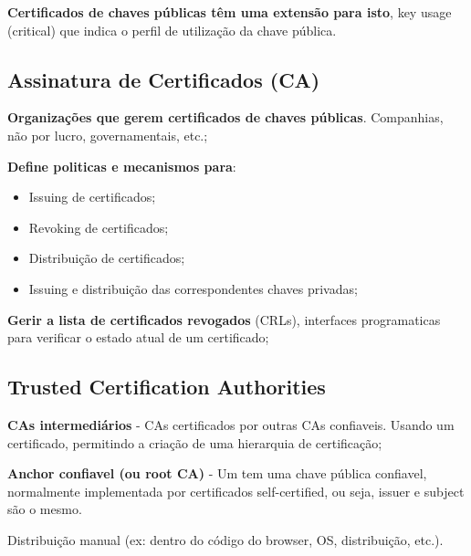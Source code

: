 \documentclass{article}
\begin{document}
\textbf{Certificados de chaves públicas têm uma extensão para isto},
key usage (critical) que indica o perfil de utilização da chave pública.

\subsection{Assinatura de Certificados (CA)}

\begin{flushleft}
  \textbf{Organizações que gerem certificados de chaves públicas}.
  Companhias, não por lucro, governamentais, etc.;

  \vspace{2mm}

  \textbf{Define politicas e mecanismos para}:
  \begin{itemize}
    \item Issuing de certificados;
    \item Revoking de certificados;
    \item Distribuição de certificados;
    \item Issuing e distribuição das correspondentes chaves privadas;
  \end{itemize}

  \vspace{2mm}

  \textbf{Gerir a lista de certificados revogados} (CRLs), interfaces
  programaticas para verificar o estado atual de um certificado;
\end{flushleft}

\pagebreak

\subsection{Trusted Certification Authorities}

\begin{flushleft}
  \textbf{CAs intermediários} - CAs certificados por outras CAs confiaveis.
  Usando um certificado, permitindo a criação de uma hierarquia de certificação;

  \vspace{2mm}

  \textbf{Anchor confiavel (ou root CA)} - Um tem uma chave pública
  confiavel, normalmente implementada por certificados self-certified, ou seja,
  issuer e subject são o mesmo.

  Distribuição manual (ex: dentro do código do browser, OS, distribuição, etc.).
\end{flushleft}
\end{document}
